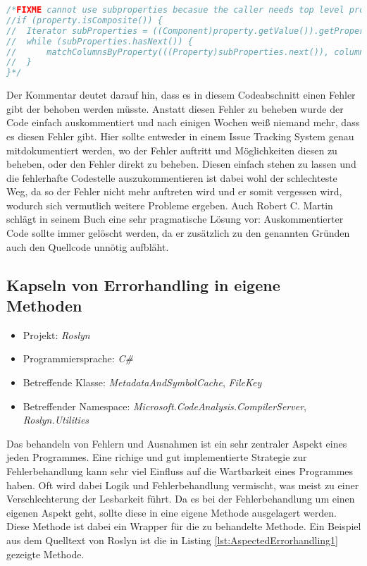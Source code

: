 \begin{lstlisting}[language=Java, caption=Beispiele für auskommentierten Code, label=lst:CommentedCode]
/*FIXME cannot use subproperties becasue the caller needs top level properties
//if (property.isComposite()) {
//	Iterator subProperties = ((Component)property.getValue()).getPropertyIterator();
// 	while (subProperties.hasNext()) {
//  	matchColumnsByProperty(((Property)subProperties.next()), columnsToProperty);
// 	}
}*/ 
\end{lstlisting}

\SuperPar Der Kommentar deutet darauf hin, dass es in diesem Codeabschnitt einen Fehler gibt der behoben werden müsste. Anstatt diesen Fehler zu beheben wurde der Code einfach auskommentiert und nach einigen Wochen weiß niemand mehr, dass es diesen Fehler gibt. Hier sollte entweder in einem Issue Tracking System genau mitdokumentiert werden, wo der Fehler auftritt und Möglichkeiten diesen zu beheben, oder den Fehler direkt zu beheben. Diesen einfach stehen zu lassen und die fehlerhafte Codestelle auszukommentieren ist dabei wohl der schlechteste Weg, da so der Fehler nicht mehr auftreten wird und er somit vergessen wird, wodurch sich vermutlich weitere Probleme ergeben. Auch Robert C. Martin schlägt in seinem Buch eine sehr pragmatische Lösung vor: Auskommentierter Code sollte immer gelöscht werden, da er zusätzlich zu den genannten Gründen auch den Quellcode unnötig aufbläht.

\subsection{Kapseln von Errorhandling in eigene Methoden}
\begin{itemize}
	\item Projekt: \textit{Roslyn}
	\item Programmiersprache: \textit{C\#}
	\item Betreffende Klasse: \textit{MetadataAndSymbolCache}, \textit{FileKey}
	\item Betreffender Namespace: \textit{Microsoft.CodeAnalysis.CompilerServer}, \textit{Roslyn.Utilities}
\end{itemize}

\SuperPar Das behandeln von Fehlern und Ausnahmen ist ein sehr zentraler Aspekt eines jeden Programmes. Eine richige und gut implementierte Strategie zur Fehlerbehandlung kann sehr viel Einfluss auf die Wartbarkeit eines Programmes haben. Oft wird dabei Logik und Fehlerbehandlung vermischt, was meist zu einer Verschlechterung der Lesbarkeit führt. Da es bei der Fehlerbehandlung um einen eigenen Aspekt geht, sollte diese in eine eigene Methode ausgelagert werden. Diese Methode ist dabei ein Wrapper für die zu behandelte Methode. Ein Beispiel aus dem Quelltext von Roslyn ist die in Listing \ref{lst:AspectedErrorhandling1} gezeigte Methode.

